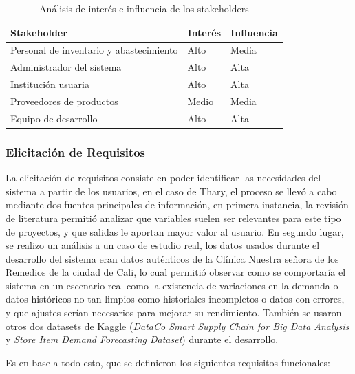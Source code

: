 \begin{table}[H]
\centering
\caption{Análisis de interés e influencia de los stakeholders}
\label{tab:stakeholders_interes_influencia}

\renewcommand{\arraystretch}{1.3}
\begin{tabularx}{\textwidth}{|>{\raggedright\arraybackslash}p{4cm}|>{\raggedright\arraybackslash}X|>{\centering\arraybackslash}p{3cm}|}
\hline
\textbf{Stakeholder} & \textbf{Interés} & \textbf{Influencia} \\
\hline
Personal de inventario y abastecimiento
& Alto
& Media \\
\hline
Administrador del sistema
& Alto
& Alta \\
\hline
Institución usuaria
& Alto
& Alta \\
\hline
Proveedores de productos
& Medio
& Media \\
\hline
Equipo de desarrollo
& Alto
& Alta \\
\hline
\end{tabularx}
\end{table}

\subsubsection{Elicitación de Requisitos}
La elicitación de requisitos consiste en poder identificar las necesidades del sistema a partir de los usuarios, en el caso de Thary, el proceso se llevó a cabo mediante dos fuentes principales de información, en primera instancia, la revisión de literatura permitió analizar que variables suelen ser relevantes para este tipo de proyectos, y que salidas le aportan mayor valor al usuario. En segundo lugar, se realizo un análisis a un caso de estudio real, los datos usados durante el desarrollo del sistema eran datos auténticos de la Clínica Nuestra señora de los Remedios de la ciudad de Cali, lo cual permitió observar como se comportaría el sistema en un escenario real como la existencia de variaciones en la demanda o datos históricos no tan limpios como historiales incompletos o datos con errores, y que ajustes serían necesarios para mejorar su rendimiento. También se usaron otros dos datasets de Kaggle (\textit{DataCo Smart Supply Chain for Big Data Analysis} y \textit{Store Item Demand Forecasting Dataset}) durante el desarrollo.

Es en base a todo esto, que se definieron los siguientes requisitos funcionales:

